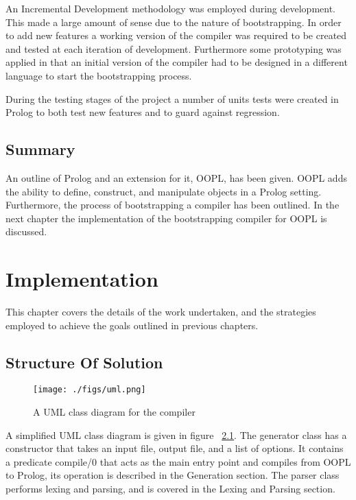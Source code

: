 \documentclass[12pt,a4paper,twoside,openright]{report}
\begin{document}
An Incremental Development methodology was employed during development. This made a large amount of sense due to the nature of bootstrapping. In order to add new features a working version of the compiler was required to be created and tested at each iteration of development. Furthermore some prototyping was applied in that an initial version of the compiler had to be designed in a different language to start the bootstrapping process.

\bigskip

During the testing stages of the project a number of units tests were created in Prolog to both test new features and to guard against regression. 

\section {Summary}

An outline of Prolog and an extension for it, OOPL, has been given. OOPL adds the ability to define, construct, and manipulate objects in a Prolog setting. Furthermore, the process of bootstrapping a compiler has been outlined. In the next chapter the implementation of the bootstrapping compiler for OOPL is discussed.

\chapter{Implementation}


This chapter covers the details of the work undertaken, and the strategies employed to achieve the goals outlined in previous chapters.

\section{Structure Of Solution}

\begin{figure}
\texttt{[image: ./figs/uml.png]}
\caption{A UML class diagram for the compiler}
\label{fig:1}
\end{figure}

A simplified UML class diagram is given in figure ~\ref{fig:1}. The generator class has a constructor that takes an input file, output file, and a list of options. It contains a predicate compile/0 that acts as the main entry point and compiles from OOPL to Prolog, its operation is described in the Generation section. The parser class performs lexing and parsing, and is covered in the Lexing and Parsing section.
\end{document}
